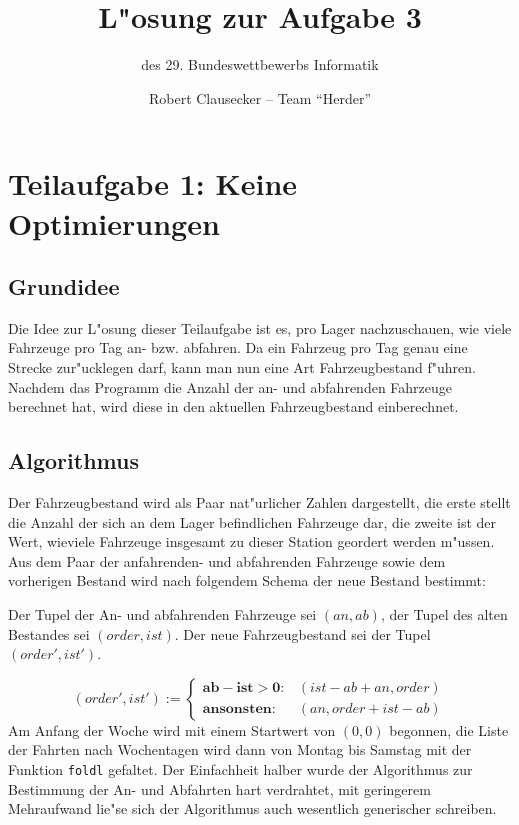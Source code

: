 \documentclass{scrreprt}
\author {Robert Clausecker -- Team "`Herder"'}
\title {L"osung zur Aufgabe 3}
\subtitle {des 29. Bundeswettbewerbs Informatik}
\begin{document}
\maketitle

\tableofcontents \newpage


\chapter {Teilaufgabe 1: Keine Optimierungen}

\section {Grundidee}
Die Idee zur L"osung dieser Teilaufgabe ist es, pro Lager nachzuschauen, wie
viele Fahrzeuge pro Tag an- bzw. abfahren.  Da ein Fahrzeug pro Tag genau eine
Strecke zur"ucklegen darf, kann man nun eine Art Fahrzeugbestand f"uhren.
Nachdem das Programm die Anzahl der an- und abfahrenden Fahrzeuge berechnet
hat, wird diese in den aktuellen Fahrzeugbestand einberechnet.

\section {Algorithmus}
Der Fahrzeugbestand wird als Paar nat"urlicher Zahlen dargestellt, die
erste stellt die Anzahl der sich an dem Lager befindlichen Fahrzeuge dar, die
zweite ist der Wert, wieviele Fahrzeuge insgesamt zu dieser Station geordert
werden m"ussen.  Aus dem Paar der anfahrenden- und abfahrenden Fahrzeuge sowie
dem vorherigen Bestand wird nach folgendem Schema der neue Bestand bestimmt:

Der Tupel der An- und abfahrenden Fahrzeuge sei $(an,ab)$, der
Tupel des alten Bestandes sei $(order,ist)$. Der neue Fahrzeugbestand sei
der Tupel $(order',ist')$.

$$
(order',ist') := \left \{\begin{array}{rl}
\mathbf{ab - ist > 0:} & (ist - ab + an, order)
\\
\mathbf{ansonsten:}    & (an, order + ist - ab)
\end{array}\right .$$
Am Anfang der Woche wird mit einem Startwert von $(0,0)$ begonnen, die Liste der
Fahrten nach Wochentagen wird dann von Montag bis Samstag mit der Funktion
\texttt{foldl} gefaltet.  Der Einfachheit halber wurde der Algorithmus zur
Bestimmung der An- und Abfahrten hart verdrahtet, mit geringerem Mehraufwand
lie"se sich der Algorithmus auch wesentlich generischer schreiben.
\end{document}
